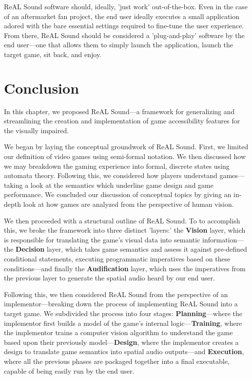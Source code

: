 \documentclass{report}
\newcommand{\rs}{ReAL Sound\xspace}
\newcommand{\plan}{\textbf{Planning}\xspace}
\newcommand{\train}{\textbf{Training}\xspace}
\newcommand{\design}{\textbf{Design}\xspace}
\newcommand{\exec}{\textbf{Execution}\xspace}
\newcommand{\vision}{\textbf{Vision}\xspace}
\newcommand{\decision}{\textbf{Decision}\xspace}
\newcommand{\audio}{\textbf{Audification}\xspace}
\newcommand{\imp}{implementor\xspace}
\begin{document}
\rs software should, ideally, 'just work' out-of-the-box. Even in the case of an aftermarket fan project, the end user ideally executes a small application adored with the bare essential settings required to fine-tune the user experience. From there, \rs should be considered a 'plug-and-play' software by the end user---one that allows them to simply launch the application, launch the target game, sit back, and enjoy.

\section{Conclusion}
In this chapter, we proposed \rs---a framework for generalizing and streamlining the creation and implementation of game accessibility features for the visually impaired. 

We began by laying the conceptual groundwork of \rs. First, we limited our definition of video games using semi-formal notation. We then discussed how we may breakdown the gaming experience into formal, discrete states using automata theory. Following this, we considered how players understand games---taking a look at the semantics which underline game design and game performance. We concluded our discussion of conceptual topics by giving an in-depth look at how games are analyzed from the perspective of human vision.

We then proceeded with a structural outline of \rs. To to accomplish this, we broke the framework into three distinct 'layers:' the \vision layer, which is responsible for translating the game's visual data into semantic information---the \decision layer, which takes game semantics and assess it against pre-defined conditional statements, executing programmatic imperatives based on these conditions---and finally the \audio layer, which uses the imperatives from the previous layer to generate the spatial audio heard by our end user. 

Following this, we then considered \rs from the perspective of an \imp---breaking down the process of implementing \rs into a target game. We subdivided the process into four stages: \plan---where the implementor first builds a model of the game's internal logic---\train, where the \imp trains a computer vision algorithm to understand the game based upon their previously model---\design, where the \imp creates a design to translate game semantics into spatial audio outputs---and \exec, where all the previous phases are packaged together into a final executable, capable of being easily run by the end user. 
\end{document}
